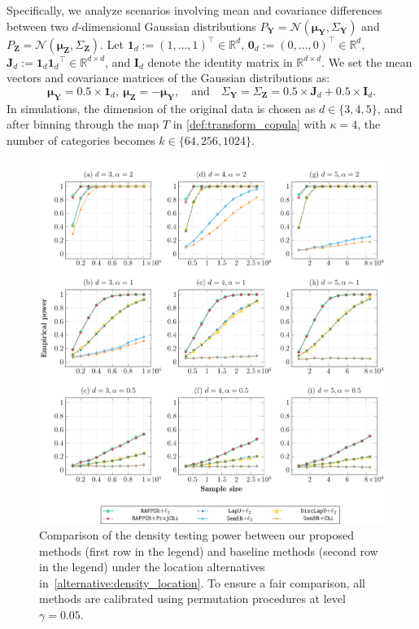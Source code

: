 \documentclass[twoside,11pt]{article}
\newcommand{\vecOne}[1]{\mathbf{1}_{#1}}
\newcommand{\vecZero}[1]{\mathbf{0}_{#1}}
\newcommand{\matOne}[1]{\mathbf{J}_{#1}}
\newcommand{\numbersetReal}{\mathbb{R}} %
\newcommand{\rvTwo}{Y}
\newcommand{\rvThree}{Z}
\newcommand{\vectorize}[1]{\mathbf{#1}}
\newcommand{\dimDensity}{d} %
\begin{document}
Specifically, we analyze scenarios involving mean and covariance differences between two $\dimDensity$-dimensional Gaussian distributions
$P_{\vectorize{\rvTwo}} = \mathcal{N}(
\boldsymbol{\mu}_{\vectorize{\rvTwo}}
,
\Sigma_{\vectorize{\rvTwo}}
)$
and
$P_{\vectorize{\rvThree}} = \mathcal{N}(
\boldsymbol{\mu}_{\vectorize{\rvThree}}
,
\Sigma_{\vectorize{\rvThree}}
)$. 
Let 
$
\vecOne{\dimDensity}:= (1, \ldots , 1)^\top 
\in \numbersetReal^\dimDensity
$,
$
\vecZero{\dimDensity} := (0, \ldots , 0)^\top 
\in \numbersetReal^\dimDensity$, 
%
$\matOne{\dimDensity}
:=
\vecOne{\dimDensity} {\mathbf{1}_d}^\top
\in
\numbersetReal^{\dimDensity \times \dimDensity}
$, and $\mathbf{I}_d$  denote the identity matrix in
$\mathbb{R}^{d\times d}$.
We set the mean vectors and covariance matrices of the Gaussian distributions as:
\begin{equation}\label{alternative:density_location}
	\boldsymbol{\mu}_{\vectorize{\rvTwo}}=
	0.5 \times \mathbf{1}_{\dimDensity},~
	\boldsymbol{\mu}_{\vectorize{\rvThree}}=
	-\boldsymbol{\mu}_{\vectorize{\rvTwo}},
	\quad \text{and} \quad
	\Sigma_{\vectorize{\rvTwo}}
	=
	\Sigma_{\vectorize{\rvThree}}
	=
	0.5 \times\mathbf{J}_{\dimDensity}
	+
	0.5 \times \mathbf{I}_{\dimDensity}.
\end{equation}
In simulations, the dimension of the original data is chosen as $\dimDensity \in \{3,4,5\}$, and after binning through the map $T$ in \eqref{def:transform_copula} with $\kappa = 4$, the number of categories becomes $k \in \{64,256,1024\}$. 


\begin{figure}[t!]
	\centering
	\includegraphics[width=0.95\linewidth]{density_location.pdf}
	\caption{Comparison of the density testing power between our proposed methods (first row in the legend) and baseline methods (second row in the legend) under the location alternatives in~\eqref{alternative:density_location}. To ensure a fair comparison, all methods are calibrated using permutation procedures at level $\gamma = 0.05$.
	}\label{fig:power_density_location}
\end{figure}
\end{document}
